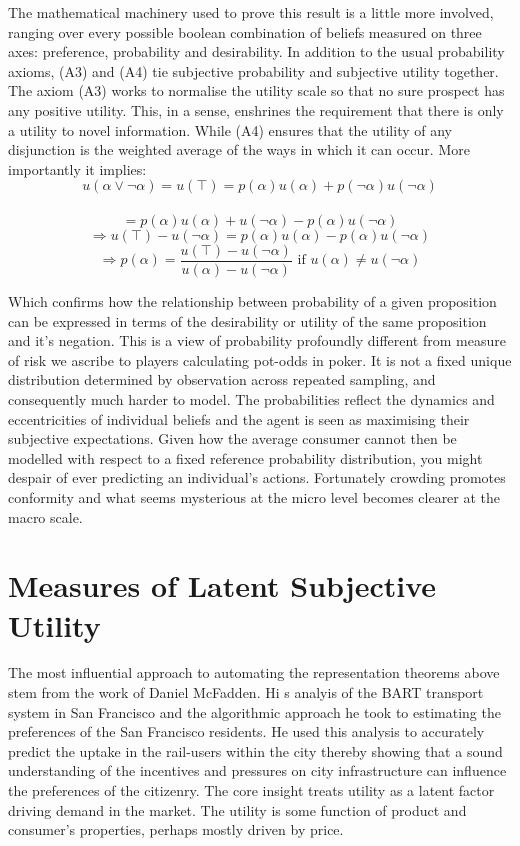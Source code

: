\documentclass[]{tufte-book}
\theoremstyle{definition}
\theoremstyle{definition}
\theoremstyle{definition}
\theoremstyle{remark}
\begin{document}
The mathematical machinery used to prove this result is a little more involved, ranging over every possible boolean combination of beliefs measured on three axes: preference, probability and desirability. In addition to the usual probability axioms, (A3) and (A4) tie subjective probability and subjective utility together. The axiom (A3) works to normalise the utility scale so that no sure prospect has any positive utility. This, in a sense, enshrines the requirement that there is only a utility to novel information. While (A4) ensures that the utility of any disjunction is the weighted average of the ways in which it can occur. More importantly it implies: \[u(\alpha \vee \neg\alpha) = u(\top) = p(\alpha)u(\alpha) + p(\neg\alpha)u(\neg\alpha)\]~\[= p(\alpha)u(\alpha) + u(\neg\alpha) - p(\alpha)u(\neg\alpha) \] \[ \Rightarrow u(\top) - u(\neg\alpha) = p(\alpha)u(\alpha) - p(\alpha)u(\neg\alpha)\] \[ \Rightarrow p(\alpha) = \frac{u(\top) - u(\neg\alpha)}{ u(\alpha) - u(\neg\alpha)} \text{ if } u(\alpha) \neq u(\neg\alpha) \]

Which confirms how the relationship between probability of a given proposition can be expressed in terms of the desirability or utility of the same proposition and it's negation. This is a view of probability profoundly different from measure of risk we ascribe to players calculating pot-odds in poker. It is not a fixed unique distribution determined by observation across repeated sampling, and consequently much harder to model. The probabilities reflect the dynamics and eccentricities of individual beliefs and the agent is seen as maximising their subjective expectations. Given how the average consumer cannot then be modelled with respect to a fixed reference probability distribution, you might despair of ever predicting an individual's actions. Fortunately crowding promotes conformity and what seems mysterious at the micro level becomes clearer at the macro scale.

\hypertarget{measures-of-latent-subjective-utility}{%
\section{Measures of Latent Subjective Utility}\label{measures-of-latent-subjective-utility}}

The most influential approach to automating the representation theorems above stem from the work of Daniel McFadden. Hi s analyis of the BART transport system in San Francisco and the algorithmic approach he took to estimating the preferences of the San Francisco residents. He used this analysis to accurately predict the uptake in the rail-users within the city thereby showing that a sound understanding of the incentives and pressures on city infrastructure can influence the preferences of the citizenry. The core insight treats utility as a latent factor driving demand in the market. The utility is some function of product and consumer's properties, perhaps mostly driven by price.
\end{document}
